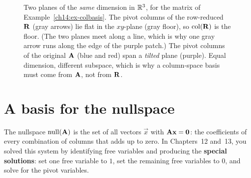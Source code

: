 \begin{figure}[htbp]
\centering
{}
\caption{Two planes of the \emph{same} dimension in $\mathbb{R}^3$, for the matrix of
Example~\ref{ch14:ex-colbasis}. The pivot columns of the row-reduced
$\mathbf{R}$ (gray arrows) lie flat in the $xy$-plane (gray floor),
so $\operatorname{col}(\mathbf{R})$ is the floor. (The two planes meet along a line, which is why one gray
arrow runs along the edge of the purple patch.) The pivot columns of the original $\mathbf{A}$ (blue and red)
span a \emph{tilted} plane (purple). Equal
dimension, different subspace, which is why a column-space basis must come
from $\mathbf{A}$, not from $\mathbf{R}$.}
\label{ch14:fig-tilted}
\end{figure}

\section{A basis for the nullspace}
\label{ch14:nullbasis}

The nullspace $\operatorname{null}(\mathbf{A})$ is the set of all vectors $\vec{x}$ with $\mathbf{A}\mathbf{x}
= \mathbf{0}$: the coefficients of every combination of columns that adds up to zero. In Chapters~12 and~13,
you solved this system by identifying free variables and producing the
\textbf{special solutions}: set one free variable to $1$, set the remaining free
variables to $0$, and solve for the pivot variables.


